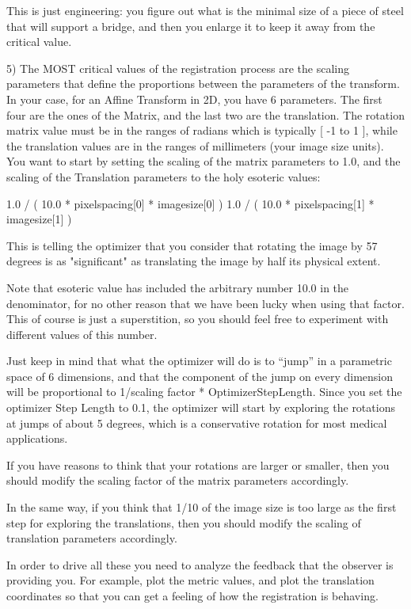 This is just engineering: you figure out what is the minimal
size of a piece of steel that will support a bridge, and then
you enlarge it to keep it away from the critical value.

5)  The MOST critical values of the registration process are the
scaling parameters that define the proportions between
the parameters of the transform. In your case, for an Affine
Transform in 2D, you have 6 parameters. The first four are
the ones of the Matrix, and the last two are the translation.
The rotation matrix value must be in the ranges of radians
which is typically [ -1 to 1 ], while the translation values are
in the ranges of millimeters (your image size units).
You want to start by setting the scaling of the matrix
parameters to 1.0, and the scaling of the Translation
parameters to the holy esoteric values:

1.0   /  (  10.0 * pixelspacing[0]  *  imagesize[0]  )
1.0   /  (  10.0 * pixelspacing[1]  *  imagesize[1]  )

This is telling the optimizer that you consider that rotating
the image by 57 degrees is as "significant" as translating
the image by half its physical extent.

Note that esoteric value has included the arbitrary number
10.0 in the denominator, for no other reason that we have
been lucky when using that factor. This of course is just a
superstition, so you should feel free to experiment with
different values of this number.

Just keep in mind that what the optimizer will do is to
``jump'' in a parametric space of 6 dimensions, and that the
component of the jump on every dimension will be proportional
to 1/scaling factor * OptimizerStepLength.     Since you set
the optimizer Step Length to 0.1, the optimizer will start
by exploring the rotations at jumps of about 5 degrees, which
is a conservative rotation for most medical applications.

If you have reasons to think that your rotations are larger or
smaller, then you should modify the scaling factor of the  matrix
parameters accordingly.

In the same way, if you think that 1/10 of the image size is too
large as the first step for exploring the translations, then you
should modify the scaling of  translation parameters accordingly.



In order to drive all these you need to analyze the feedback that
the observer is providing you. For example, plot the metric values,
and plot the translation coordinates so that you can get a feeling
of how the registration is behaving.


